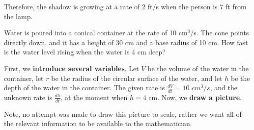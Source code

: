 \documentclass{ximera}
\begin{document}
\begin{example}
\begin{explanation}
      Therefore, the shadow is growing
    at a rate of $2$ ft/s when the person is $7$ ft from the lamp.\\
  \end{explanation}
\end{example}


\begin{example}
Water is poured into a conical container at the rate of 10
cm${}^3$/s.  The cone points directly down, and it has a height of
30 cm and a base radius of 10 cm.  How fast is the water level rising
when the water is 4 cm deep?

\begin{explanation}
First, we \textbf{introduce several variables}. Let $V$ be the volume of the water in the container, let $r$ be the radius of the circular surface of the water, and  let $h$ be the depth of the water in the container. The given rate is $\frac{dV}{dt}=10$ $cm^3/s$, and the unknown rate is $\frac{dh}{dt}$, at the moment when $h=4$ cm.
    Now, we \textbf{draw a picture}.
\begin{image}
\end{image}
Note, no attempt was made to draw this picture to scale, rather we
want all of the relevant information to be available to the
mathematician.


\end{explanation}
\end{example}
\end{document}
